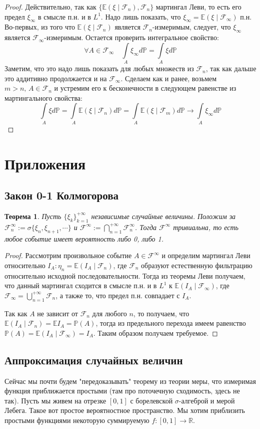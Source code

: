 \documentclass[12pt,a4paper]{article} %
\newtheorem{theorem}{Теорема}
\newcommand{\R}{\mathbb{R}}
\newcommand{\E}{\mathbb{E}}
\newcommand{\PR}{\mathbb{P}}
\newcommand{\F}{\mathcal{F}}
\begin{document}
	\begin{proof}
		Действительно, так как $\{\E(\xi\mid\F_n),\F_n\}$ мартингал Леви, то есть его предел $\xi_{\infty}$ в смысле п.н. и в $L^1$. Надо лишь показать, что $\xi_{\infty}=\E(\xi\mid\F_{\infty})$ п.н. Во-первых, из того что $\E(\xi\mid\F_n)$ является $\F_n$-измеримым, следует, что $\xi_{\infty}$ является $\F_{\infty}$-измеримым. Остается проверить интегральное свойство:
		$$\forall A\in\F_{\infty}\quad\int\limits_{A}\xi_{\infty}d\PR=\int\limits_{A}\xi d\PR$$
		Заметим, что это надо лишь показать для любых множеств из $\F_n$, так как дальше это аддитивно продолжается и на $\F_{\infty}$. Сделаем как и ранее, возьмем $m>n,\,A\in\F_n$ и устремим его к бесконечности в следующем равенстве из мартингального свойства:
		$$\int\limits_{A}\xi d\PR=\int\limits_{A}\E(\xi\mid\F_n)d\PR=\int\limits_{A}\E(\xi\mid\F_m)d\PR\rightarrow\int\limits_{A}\xi_{\infty}d\PR$$
	\end{proof}
	\section{Приложения}
	\subsection{Закон 0-1 Колмогорова}
	\begin{theorem}
		Пусть $\{\xi_k\}_{k=1}^{+\infty}$ независимые случайные величины. Положим за $\F_n^{\infty}:=\sigma\{\xi_n,\xi_{n+1},\cdots\}$ и $\F^{\infty}:=\bigcap_{n=1}^{+\infty}\F_n^{\infty}$. Тогда $\F^{\infty}$ тривиальна, то есть любое событие имеет вероятность либо 0, либо 1.
	\end{theorem}
	\begin{proof}
		Рассмотрим произвольное событие $A\in\F^{\infty}$ и определим мартингал Леви относительно $I_A:\eta_n=\E(I_A\mid\F_n)$, где $\F_n$ образуют естественную фильтрацию относительно исходной последовательности. Тогда из теоремы Леви получаем, что данный мартингал сходится в смысле п.н. и в $L^1$ к $\E(I_A\mid\F_{\infty})$, где $\F_{\infty}=\bigcup_{n=1}^{+\infty}\F_n$, а также то, что предел п.н. совпадает с $I_A$.
		
		Так как $A$ не зависит от $\F_n$ для любого $n$, то получаем, что $\E(I_A\mid\F_n)=\E I_A=\PR(A)$, тогда из предельного перехода имеем равенство $\PR(A)=\E(I_A\mid\F_{\infty})=I_A$. Таким образом получаем требуемое.
	\end{proof}
	\subsection{Аппроксимация случайных величин}
	Сейчас мы почти будем "передоказывать" теорему из теории меры, что измеримая функция приближается простыми (там про поточечную сходимость, здесь не так). Пусть мы живем на отрезке $[0,1]$ с борелевской $\sigma$-алгеброй и мерой Лебега. Такое вот простое вероятностное пространство. Мы хотим приблизить простыми функциями некоторую суммируемую $f:[0,1]\rightarrow\R$.
	
\end{document}
